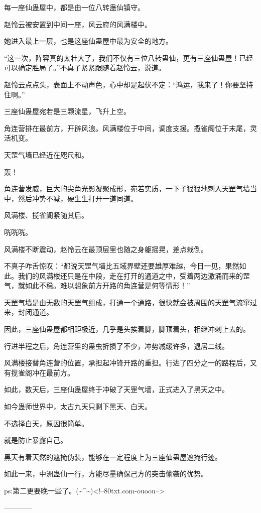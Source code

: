 \begin{this_body}
每一座仙蛊屋中，都是由一位八转蛊仙镇守。

赵怜云被安置到中间一座，风云府的风满楼中。

她进入最上一层，也是这座仙蛊屋中最为安全的地方。

“这一次，阵容真的太壮大了，我们不仅有三位八转蛊仙，更有三座仙蛊屋！已经可以确定胜局了。”不真子紧紧跟随着赵怜云，说道。

赵怜云点点头，表面上不动声色，心中却是起伏不定：“鸿运，我来了！你要坚持住啊。”

三座仙蛊屋宛若是三颗流星，飞升上空。

角连营排在最前方，开辟风浪。风满楼位于中间，调度支援。揽雀阁位于末尾，灵活机变。

天罡气墙已经近在咫尺和。

轰！

角连营发威，巨大的尖角光影凝聚成形，宛若实质，一下子狠狠地刺入天罡气墙当中，然后冲势不减，硬生生打开一道同道。

风满楼、揽雀阁紧随其后。

咣咣咣。

风满楼不断震动，赵怜云在最顶层里也随之身躯摇晃，差点栽倒。

不真子咋舌惊叹：“都说天罡气墙比五域界壁还要雄厚难越，今日一见，果然如此。我们的风满楼还只是在中段，走在打开的通道之中，受着两边激涌而来的罡气，就如此不稳。难以想象前方开路的角连营是何等情形！”

天罡气墙是由无数的天罡气组成，打通一个通路，很快就会被周围的天罡气流窜过来，封闭通道。

因此，三座仙蛊屋都相距极近，几乎是头挨着脚，脚顶着头，相继冲刺上去的。

行进半程之后，角连营里的蛊虫折损了不少，冲势减缓许多，退居二线。

风满楼接替角连营的位置，承担起冲锋开路的重担。行进了四分之一的路程后，又有揽雀阁冲在最前方。

如此，数天后，三座仙蛊屋终于冲破了天罡气墙，正式进入了黑天之中。

如今蛊师世界中，太古九天只剩下黑天、白天。

不选择白天，原因很简单。

就是防止暴露自己。

黑天有着天然的遮掩伪装，能够在一定程度上为三座仙蛊屋遮掩行迹。

如此一来，中洲蛊仙一行，方能尽量确保己方的突击偷袭的优势。

ps:第二更要晚一些了。(\~{}\^{}\~{})<!--80txt.com-ouoou-->

------------

\end{this_body}

